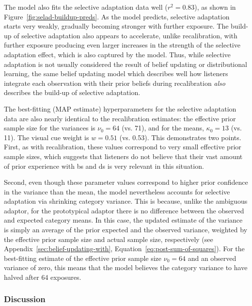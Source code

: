 The model also fits the selective adaptation data well ($r^2=0.83$), as shown in Figure~\ref{fig:selad-buildup-preds}.  As the model predicts, selective adaptation starts very weakly, gradually becoming stronger with further exposure.  The build-up of selective adaptation also appears to accelerate, unlike recalibration, with further exposure producing even larger increases in the strength of the selective adaptation effect, which is also captured by the model.  Thus, while selective adaptation is not usually considered the result of belief updating or distributional learning, the same belief updating model which describes well how listeners integrate each observation with their prior beliefs during recalibration \emph{also} describes the build-up of selective adaptation.

The best-fitting (MAP estimate) hyperparameters for the selective adaptation data are also nearly identical to the recalibration estimates: the effective prior sample size for the variances is $\nu_0=64$ (vs. 71), and for the means, $\kappa_0=13$ (vs. 11).  The visual cue weight is $w=0.51$ (vs. 0.53).  This demonstrates two points.  First, as with recalibration, these values correspond to very small effective prior sample sizes, which suggests that listeners do not believe that their vast amount of prior experience with \ph bs and \ph ds is very relevant in this situation.

Second, even though these parameter values correspond to higher prior confidence in the variance than the mean, the model nevertheless accounts for selective adaptation via shrinking category variance.  This is because, unlike the ambiguous adaptor, for the prototypical adaptor there is no difference between the observed and expected category means.  In this case, the updated estimate of the variance is simply an average of the prior expected and the observed variance, weighted by the effective prior sample size and actual sample size, respectively (see Appendix~\ref{sec:belief-updating-with}, Equation~\eqref{eq:post-sum-of-squares}).  For the best-fitting estimate of the effective prior sample size $\nu_0=64$ and an observed variance of zero, this means that the model believes the category variance to have halved after 64 exposures.

\subsubsection{Discussion}
\label{sec:discussion-sel-ad}


